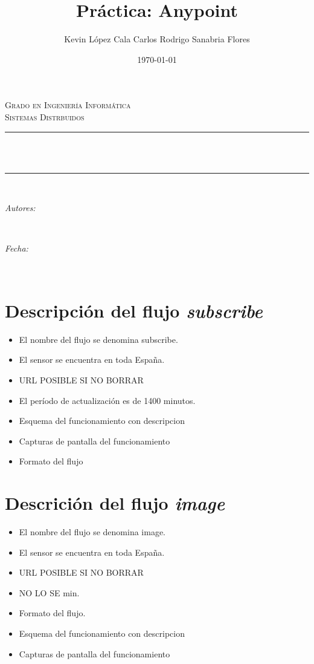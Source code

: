 \documentclass[12pt]{article}
\title{Práctica: Anypoint}
\author{Kevin López Cala \break Carlos Rodrigo Sanabria Flores}
\date{\today}
\makeatletter
\let\thetitle\@title
\let\theauthor\@author
\let\thedate\@date
\makeatother
\begin{document}

\begin{titlepage}
	\centering
	\vspace*{0.5 cm}
	\textsc{\Large Grado en Ingeniería Informática}\\[0.5 cm]
	\textsc{\LARGE Sistemas Distrbuidos}\\[0.5 cm]
	\rule{\linewidth}{0.2 mm} \\[0.4 cm]
	{ \huge \bfseries \thetitle}\\
	\rule{\linewidth}{0.2 mm} \\[1.5 cm]
	\begin{minipage}{0.4\textwidth}
		\begin{flushleft} \large
			\emph{Autores:}\\
			\theauthor
		\end{flushleft}
	\end{minipage}~
	\begin{minipage}{0.453\textwidth}
		\begin{flushright} \large
			\emph{Fecha:}\\
			\thedate
		\end{flushright}
	\end{minipage}\\[2 cm]
	\vfill
\end{titlepage}
\pagebreak
\section{Descripción del flujo \textit{subscribe}}
\begin{itemize}
	\item El nombre del flujo se denomina subscribe.
	\item El sensor se encuentra en toda España.
	\item URL POSIBLE SI NO BORRAR
	\item El período de actualización es de 1400 minutos.
	\item Esquema del funcionamiento con descripcion
	\item Capturas de pantalla del funcionamiento
	\item Formato del flujo %
\end{itemize}
\section{Descrición del flujo \textit{image}}
\begin{itemize}
	\item El nombre del flujo se denomina image.
	\item El sensor se encuentra en toda España.
	\item URL POSIBLE SI NO BORRAR
	\item NO LO SE min.
	\item Formato del flujo. %
	\item Esquema del funcionamiento con descripcion
	\item Capturas de pantalla del funcionamiento
\end{itemize}
\end{document}
